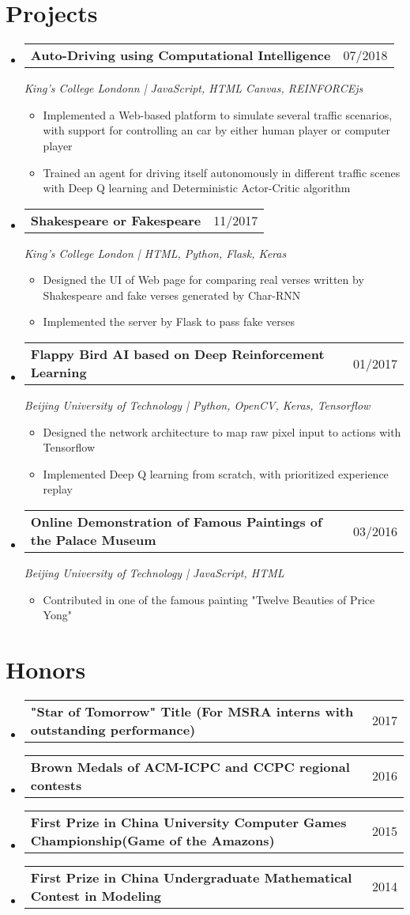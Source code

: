 \documentclass[a4paper,11pt]{article}
\makeatletter
\newcommand{\resumeItem}[1]{
  \item\small{#1 \vspace{-2pt}}
}
\newcommand{\resumeSubheading}[3]{
  \vspace{-1pt}\item
    \begin{tabular*}{0.97\textwidth}{l@{\extracolsep{\fill}}r}
      \textbf{#1} & #2
      \end{tabular*}
      \textit{\small#3}
}
\newcommand{\resumeMiniheading}[2]{
  \vspace{-1pt}\item
    \begin{tabular*}{0.97\textwidth}{l@{\extracolsep{\fill}}r}
      \textbf{#1} & #2
    \end{tabular*}
}
\newcommand{\resumeItemListStart}{\begin{itemize}[leftmargin=*, topsep=0ex]}
\newcommand{\resumeItemListEnd}{\end{itemize}}
\makeatother
\begin{document}
\section{Projects}
  \begin{itemize}[leftmargin=*, itemsep=5pt, label={}]
    \resumeSubheading{Auto-Driving using Computational Intelligence}{07/2018}{King's College Londonn \textnormal{|} JavaScript, HTML Canvas, REINFORCEjs}
      \resumeItemListStart
        \resumeItem {Implemented a Web-based platform to simulate several traffic scenarios, with support for controlling an car by either human player or computer player}
        \resumeItem {Trained an agent for driving itself autonomously in different traffic scenes with Deep Q learning and Deterministic Actor-Critic algorithm}
      \resumeItemListEnd
    
    \resumeSubheading{Shakespeare or Fakespeare}{11/2017}
    {King's College London \textnormal{|} HTML, Python, Flask, Keras}
      \resumeItemListStart
        \resumeItem {Designed the UI of Web page for comparing real verses written by Shakespeare and fake verses generated by Char-RNN}
        \resumeItem {Implemented the server by Flask to pass fake verses}
      \resumeItemListEnd

    \resumeSubheading{Flappy Bird AI based on Deep Reinforcement Learning}{01/2017}
    {Beijing University of Technology \textnormal{|} Python, OpenCV, Keras, Tensorflow}
        \resumeItemListStart
            \resumeItem {Designed the network architecture to map raw pixel input to actions with Tensorflow}
            \resumeItem {Implemented Deep Q learning from scratch, with prioritized experience replay}
        \resumeItemListEnd
  
    \resumeSubheading{Online Demonstration of Famous Paintings of the Palace Museum}{03/2016}{Beijing University of Technology \textnormal{|} JavaScript, HTML}
        \resumeItemListStart
          \resumeItem {Contributed in one of the famous painting "Twelve Beauties of Price Yong"}
        \resumeItemListEnd
        
  \end{itemize}

\section{Honors}
  \begin{itemize}[leftmargin=*, itemsep=-1pt, label={}]
    \resumeMiniheading{"Star of Tomorrow" Title {\normalfont(For MSRA interns with outstanding performance)}}{2017}
    \resumeMiniheading{Brown Medals of ACM-ICPC and CCPC regional contests}{2016}
    \resumeMiniheading{First Prize in China University Computer Games Championship(Game of the Amazons)}{2015}
    \resumeMiniheading{First Prize in China Undergraduate Mathematical Contest in Modeling}{2014}
  \end{itemize}
\end{document}
